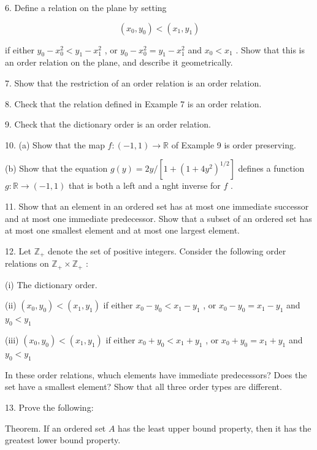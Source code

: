 \documentclass[10pt]{article}
\begin{document}
6. Define a relation on the plane by setting

\[
\left( {{x}_{0},{y}_{0}}\right)  < \left( {{x}_{1},{y}_{1}}\right)
\]

if either \({y}_{0} - {x}_{0}^{2} < {y}_{1} - {x}_{1}^{2}\) , or \({y}_{0} - {x}_{0}^{2} = {y}_{1} - {x}_{1}^{2}\) and \({x}_{0} < {x}_{1}\) . Show that this is an order relation on the plane, and describe it geometrically.

7. Show that the restriction of an order relation is an order relation.

8. Check that the relation defined in Example 7 is an order relation.

9. Check that the dictionary order is an order relation.

10. (a) Show that the map \(f : \left( {-1,1}\right)  \rightarrow  \mathbb{R}\) of Example 9 is order preserving.

(b) Show that the equation \(g\left( y\right)  = {2y}/\left\lbrack  {1 + {\left( 1 + 4{y}^{2}\right) }^{1/2}}\right\rbrack\) defines a function \(g : \mathbb{R} \rightarrow  \left( {-1,1}\right)\) that is both a left and a nght inverse for \(f\) .

11. Show that an element in an ordered set has at most one immediate successor and at most one immediate predecessor. Show that a subset of an ordered set has at most one smallest element and at most one largest element.

12. Let \({\mathbb{Z}}_{ + }\) denote the set of positive integers. Consider the following order relations on \({\mathbb{Z}}_{ + } \times  {\mathbb{Z}}_{ + }\) :

(i) The dictionary order.

(ii) \(\left( {{x}_{0},{y}_{0}}\right)  < \left( {{x}_{1},{y}_{1}}\right)\) if either \({x}_{0} - {y}_{0} < {x}_{1} - {y}_{1}\) , or \({x}_{0} - {y}_{0} = {x}_{1} - {y}_{1}\) and \({y}_{0} < {y}_{1}\)

(iii) \(\left( {{x}_{0},{y}_{0}}\right)  < \left( {{x}_{1},{y}_{1}}\right)\) if either \({x}_{0} + {y}_{0} < {x}_{1} + {y}_{1}\) , or \({x}_{0} + {y}_{0} = {x}_{1} + {y}_{1}\) and \({y}_{0} < {y}_{1}\)

In these order relations, whuch elements have immediate predecessors? Does the set have a smallest element? Show that all three order types are different.

13. Prove the following:

Theorem. If an ordered set \(A\) has the least upper bound property, then it has the greatest lower bound property.
\end{document}

